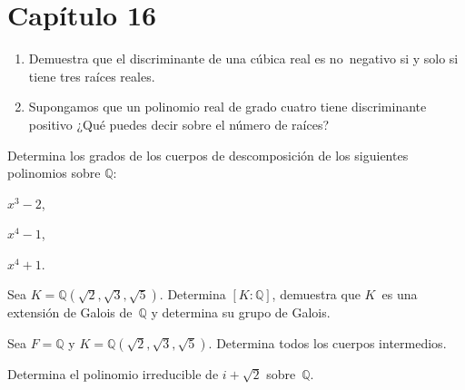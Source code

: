 \documentclass[12pt]{article}
\begin{document}
    
    \section*{Capítulo 16} %
    \label{sec:capitulo_16}
    
    
    
    \begin{exercise}[16.2.2]\quad
        \begin{enumerate}[\bfseries(a)]
            \item Demuestra que el discriminante de una cúbica real es no~negativo si y solo si tiene tres raíces reales.
            
            \item Supongamos que un polinomio real de grado cuatro tiene discriminante positivo ¿Qué puedes decir sobre el número de raíces?
        \end{enumerate}
    
    \end{exercise}
    
    \begin{exercise}[16.3.2]
        Determina los grados de los cuerpos de descomposición de los siguientes polinomios sobre $\mathbb{Q}$:
        
        
        \noindent
        \begin{inparaenum}[\bfseries(a)]
            \item $x^{3}-2$,
            \item $x^{4}-1$,
            \item $x^{4}+1$.
        \end{inparaenum}
    \end{exercise}
    
    
    \begin{exercise}[16.6.2]
        Sea $K=\mathbb{Q}(\sqrt{2}, \sqrt{3}, \sqrt{5})$. Determina $[K:\mathbb{Q}]$, demuestra que $K$~es una extensión de Galois de~$\mathbb{Q}$ y determina su grupo de Galois.
    \end{exercise}
    
    \begin{exercise}[16.7.4]
        Sea $F=\mathbb{Q}$ y  $K=\mathbb{Q}(\sqrt{2}, \sqrt{3}, \sqrt{5})$. Determina todos los cuerpos intermedios.
    \end{exercise}
    
    \begin{exercise}[16.7.7.a]
        Determina el polinomio irreducible de $i+\sqrt{2}$ sobre~$\mathbb{Q}$.
    \end{exercise}
    
\end{document}
